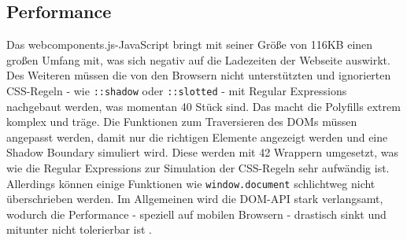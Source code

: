 \subsection{Performance}\label{performance}

Das webcomponents.js-JavaScript bringt mit seiner Größe von 116KB \cite{citeulike:13914238} einen großen Umfang mit, was sich negativ auf die Ladezeiten der Webseite auswirkt. Des Weiteren müssen die von den Browsern nicht unterstützten und ignorierten CSS-Regeln - wie \texttt{::shadow} oder \texttt{::slotted} - mit Regular Expressions nachgebaut werden, was momentan 40 Stück sind. Das macht die Polyfills extrem komplex und träge. Die Funktionen zum Traversieren des DOMs müssen angepasst werden, damit nur die richtigen Elemente angezeigt werden und eine Shadow Boundary simuliert wird. Diese werden mit 42 Wrappern umgesetzt, was wie die Regular Expressions zur Simulation der CSS-Regeln sehr aufwändig ist. Allerdings können einige Funktionen wie \texttt{window.document} schlichtweg nicht überschrieben werden. Im Allgemeinen wird die DOM-API stark verlangsamt, wodurch die Performance - speziell auf mobilen Browsern - drastisch sinkt und mitunter nicht tolerierbar ist \cite{citeulike:13886251}.
